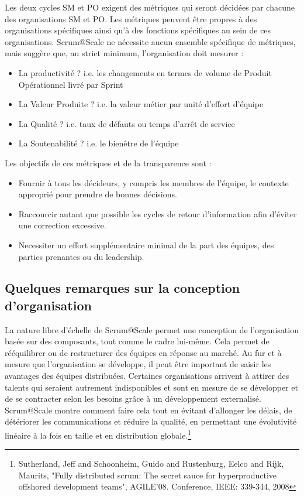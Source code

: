 \documentclass[french,12pt,a4paper,parskip=full]{scrartcl}
\begin{document}
Les deux cycles SM et PO exigent des métriques qui seront décidées par chacune des
organisations SM et PO. Les métriques peuvent être propres à des organisations
spécifiques ainsi qu'à des fonctions spécifiques au sein de ces organisations.
Scrum@Scale ne nécessite aucun ensemble spécifique de métriques, mais suggère que,
au strict minimum, l'organisation doit mesurer :
\begin{itemize}
\item La productivité ? i.e. les changements en termes de volume de Produit
Opérationnel livré par Sprint
\item La Valeur Produite ? i.e. la valeur métier par unité d'effort d'équipe
\item La Qualité ? i.e. taux de défauts ou temps d'arrêt de service
\item La Soutenabilité ? i.e. le bienêtre de l'équipe
\end{itemize}
Les objectifs de ces métriques et de la transparence sont :
\begin{itemize}
  \item Fournir à tous les décideurs, y compris les membres de l'équipe, le contexte
approprié pour prendre de bonnes décisions.
\item Raccourcir autant que possible les cycles de retour d'information afin d'éviter
une correction excessive.
\item Necessiter un effort supplémentaire minimal de la part des équipes, des parties
prenantes ou du leadership.
 \end{itemize}

\subsection{Quelques remarques sur la conception d'organisation}
La nature libre d'échelle de Scrum@Scale permet une conception de l'organisation
basée sur des composants, tout comme le cadre lui-même. Cela permet de
rééquilibrer ou de restructurer des équipes en réponse au marché. Au fur et à mesure
que l'organisation se développe, il peut être important de saisir les avantages des
équipes distribuées. Certaines organisations arrivent à attirer des talents qui seraient
autrement indisponibles et sont en mesure de se développer et de se contracter selon
les besoins grâce à un développement externalisé. Scrum@Scale montre comment
faire cela tout en évitant d'allonger les délais, de détériorer les communications et
réduire la qualité, en permettant une évolutivité linéaire à la fois en taille et en
distribution globale.\footnote{Sutherland, Jeff and Schoonheim,
Guido and Rustenburg, Eelco and Rijk, Maurits, "Fully distributed scrum:
The secret sauce for hyperproductive offshored development teams",
AGILE'08. Conference, IEEE: 339-344, 2008}
\end{document}
